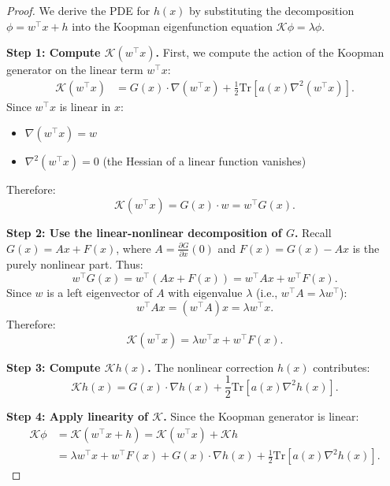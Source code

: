 \documentclass[11pt,a4paper]{article}
\newcommand{\Tr}{\mathrm{Tr}}
\newcommand{\Koop}{\mathcal{K}}
\begin{document}
\begin{proof}
We derive the PDE for $h(x)$ by substituting the decomposition $\phi = w^\top x + h$ into the Koopman eigenfunction equation $\Koop \phi = \lambda \phi$.

\textbf{Step 1: Compute $\Koop(w^\top x)$.}
First, we compute the action of the Koopman generator on the linear term $w^\top x$:
\begin{align}
\Koop(w^\top x) &= G(x) \cdot \nabla(w^\top x) + \frac{1}{2}\Tr[a(x) \nabla^2(w^\top x)].
\end{align}
Since $w^\top x$ is linear in $x$:
\begin{itemize}
\item $\nabla(w^\top x) = w$
\item $\nabla^2(w^\top x) = 0$ (the Hessian of a linear function vanishes)
\end{itemize}
Therefore:
\begin{equation}
\Koop(w^\top x) = G(x) \cdot w = w^\top G(x).
\end{equation}

\textbf{Step 2: Use the linear-nonlinear decomposition of $G$.}
Recall $G(x) = Ax + F(x)$, where $A = \frac{\partial G}{\partial x}(0)$ and $F(x) = G(x) - Ax$ is the purely nonlinear part. Thus:
\begin{equation}
w^\top G(x) = w^\top(Ax + F(x)) = w^\top Ax + w^\top F(x).
\end{equation}
Since $w$ is a left eigenvector of $A$ with eigenvalue $\lambda$ (i.e., $w^\top A = \lambda w^\top$):
\begin{equation}
w^\top Ax = (w^\top A)x = \lambda w^\top x.
\end{equation}
Therefore:
\begin{equation}
\Koop(w^\top x) = \lambda w^\top x + w^\top F(x).
\end{equation}

\textbf{Step 3: Compute $\Koop h(x)$.}
The nonlinear correction $h(x)$ contributes:
\begin{equation}
\Koop h(x) = G(x) \cdot \nabla h(x) + \frac{1}{2}\Tr[a(x) \nabla^2 h(x)].
\end{equation}

\textbf{Step 4: Apply linearity of $\Koop$.}
Since the Koopman generator is linear:
\begin{align}
\Koop \phi &= \Koop(w^\top x + h) = \Koop(w^\top x) + \Koop h \\
&= \lambda w^\top x + w^\top F(x) + G(x) \cdot \nabla h(x) + \frac{1}{2}\Tr[a(x) \nabla^2 h(x)].
\end{align}


\end{proof}
\end{document}
